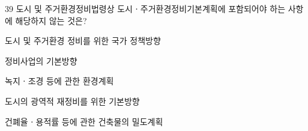\begin{question}{39}
도시 및 주거환경정비법령상 도시ㆍ주거환경정비기본계획에 포함되어야 하는 사항에 해당하지 않는 것은?
\begin{choices}
  \item 도시 및 주거환경 정비를 위한 국가 정책방향
  \item 정비사업의 기본방향
  \item 녹지ㆍ조경 등에 관한 환경계획
  \item 도시의 광역적 재정비를 위한 기본방향
  \item 건폐율ㆍ용적률 등에 관한 건축물의 밀도계획
\end{choices}
\end{question}
